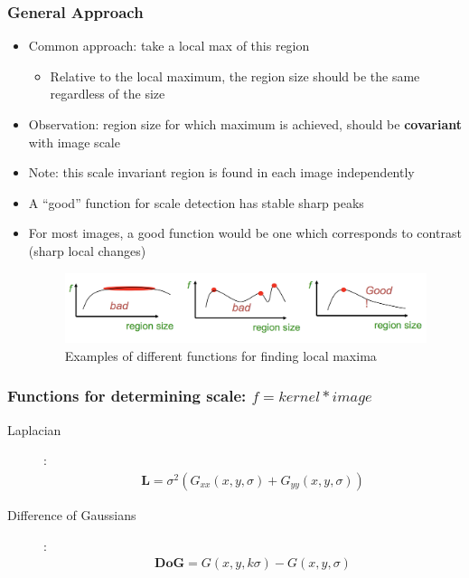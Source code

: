 \documentclass[letterpaper,12pt]{article}
\newcommand{\matr}[1]{\mathbf{#1}}
\begin{document}
\subsubsection{General Approach}
\begin{itemize}
 \item Common approach: take a local max of this region
       \begin{itemize}
        \item Relative to the local maximum, the region size should be the same regardless of the size
       \end{itemize}
 \item Observation: region size for which maximum is achieved, should be \textbf{covariant} with image scale
 \item Note: this scale invariant region is found in each image independently
 \item A ``good'' function for scale detection has stable sharp peaks
 \item For most images, a good function would be one which corresponds to contrast (sharp local changes)
       \begin{figure}
        \includegraphics[scale=0.5]{images/scaleinvariant.png}
        \caption{Examples of different functions for finding local maxima}
       \end{figure}
\end{itemize}

\subsubsection{Functions for determining scale: $f = kernel * image$}
\begin{description}
 \item[Laplacian]:
       \begin{align}
        \matr{L} = \sigma^2 (G_{xx}(x, y, \sigma) + G_{yy}(x, y, \sigma))
       \end{align}
 \item[Difference of Gaussians]:
       \begin{align}
        \textbf{DoG} = G(x, y, k\sigma) - G(x, y, \sigma)
       \end{align}
\end{description}
\end{document}
